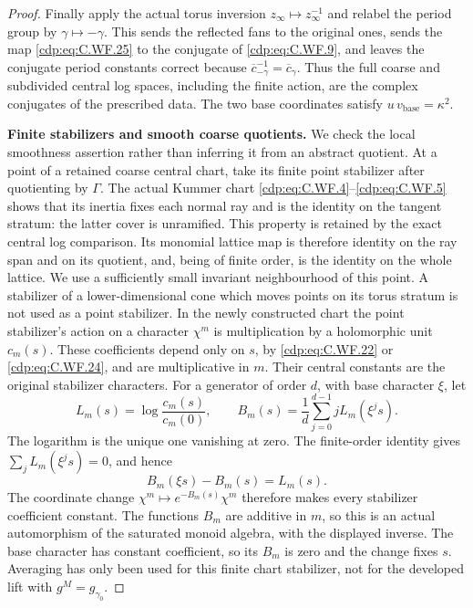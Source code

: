 \begin{proof}
Finally apply the actual torus inversion
\(z_\infty\mapsto z_\infty^{-1}\) and relabel the
period group by \(\gamma\mapsto-\gamma\).
This sends the reflected fans to the original
ones, sends the map \eqref{cdp:eq:C.WF.25} to the conjugate
of \eqref{cdp:eq:C.WF.9}, and leaves the conjugate period
constants correct because
\(\overline c_{-\gamma}^{-1}=\overline c_\gamma\).
Thus the full coarse and subdivided central
log spaces, including the finite action, are
the complex conjugates of the prescribed data.
The two base coordinates satisfy
\(u\,v_{\mathrm{base}}=\kappa^2\).

\par\medskip\noindent\textbf{Finite stabilizers and smooth coarse quotients.}
We check the local smoothness assertion rather than
inferring it from an abstract quotient.  At a point
of a retained coarse central chart, take its finite
point stabilizer after quotienting by \(\Gamma\).
The actual Kummer chart \eqref{cdp:eq:C.WF.4}--\eqref{cdp:eq:C.WF.5} shows that
its inertia fixes each normal ray and is the identity
on the tangent stratum: the latter cover is unramified.
This property is retained by the exact central log
comparison.  Its monomial lattice map is therefore
identity on the ray span and on its quotient, and,
being of finite order, is the identity on the whole
lattice.  We use a sufficiently small invariant
neighbourhood of this point.  A stabilizer of a
lower-dimensional cone which moves points on its
torus stratum is not used as a point stabilizer.
In the newly constructed chart the point stabilizer's
action on a character \(\chi^m\)
is multiplication by a holomorphic unit \(c_m(s)\).
These coefficients depend only on \(s\), by
\eqref{cdp:eq:C.WF.22} or \eqref{cdp:eq:C.WF.24}, and are multiplicative in \(m\).
Their central constants are the original stabilizer
characters.  For a generator of order \(d\), with
base character \(\xi\), let
\[
 L_m(s)=\log\!\frac{c_m(s)}{c_m(0)},\qquad
 B_m(s)=\frac1d\sum_{j=0}^{d-1}jL_m(\xi^js).
\tag{C.WF.26}\label{cdp:eq:C.WF.26}
\]
The logarithm is the unique one vanishing at zero.
The finite-order identity gives
\(\sum_jL_m(\xi^js)=0\), and hence
\[
 B_m(\xi s)-B_m(s)=L_m(s).
\tag{C.WF.27}\label{cdp:eq:C.WF.27}
\]
The coordinate change
\(\chi^m\mapsto e^{-B_m(s)}\chi^m\)
therefore makes every stabilizer coefficient constant.
The functions \(B_m\) are additive in \(m\), so this is
an actual automorphism of the saturated monoid algebra,
with the displayed inverse.  The base character has
constant coefficient, so its \(B_m\) is zero and the
change fixes \(s\).  Averaging has only been used for
this finite chart stabilizer, not for the developed
lift with \(g^M=g_{\gamma_0}\).


\end{proof}
